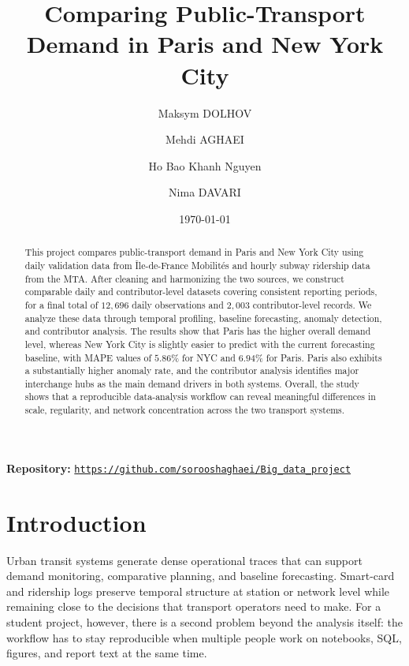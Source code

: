 \documentclass[10pt,twocolumn,a4paper]{article}
\title{Comparing Public-Transport Demand in Paris and New York City}
\author{
Maksym DOLHOV \and Mehdi AGHAEI \and Ho Bao Khanh Nguyen \and Nima DAVARI
}
\date{\today}
\begin{document}
\maketitle

\begin{center}
\small \textbf{Repository:} \href{https://github.com/sorooshaghaei/Big_data_project}{\nolinkurl{https://github.com/sorooshaghaei/Big_data_project}}
\end{center}

\begin{abstract}

This project compares public-transport demand in Paris and New York City using daily validation data from \^Ile-de-France Mobilit\'es and hourly subway ridership data from the MTA. After cleaning and harmonizing the two sources, we construct comparable daily and contributor-level datasets covering consistent reporting periods, for a final total of \(12{,}696\) daily observations and \(2{,}003\) contributor-level records. We analyze these data through temporal profiling, baseline forecasting, anomaly detection, and contributor analysis. The results show that Paris has the higher overall demand level, whereas New York City is slightly easier to predict with the current forecasting baseline, with MAPE values of \(5.86\%\) for NYC and \(6.94\%\) for Paris. Paris also exhibits a substantially higher anomaly rate, and the contributor analysis identifies major interchange hubs as the main demand drivers in both systems. Overall, the study shows that a reproducible data-analysis workflow can reveal meaningful differences in scale, regularity, and network concentration across the two transport systems.

\end{abstract}

\section{Introduction}

Urban transit systems generate dense operational traces that can support demand
monitoring, comparative planning, and baseline forecasting. Smart-card and
ridership logs preserve temporal structure at station or network level while
remaining close to the decisions that transport
operators need to make. For a student project, however, there is a second
problem beyond the analysis itself: the workflow has to stay reproducible when
multiple people work on notebooks, SQL, figures, and report text at the same
time.
\end{document}
